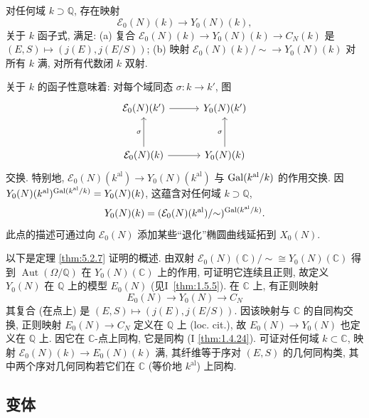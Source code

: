 \begin{theorem} \label{thm:5.2.7} 
对任何域 $k\supset\mathbb{Q}$, 存在映射
\[
\mathcal{E}_0(N)(k)\to Y_0(N)(k),
\]
关于 $k$ 函子式, 满足:
(a) 复合 $\mathcal{E}_0(N)(k)\to Y_0(N)(k)\to C_N(k)$ 是 $(E, S)\mapsto(j(E), j(E/S))$;
(b) 映射 $\mathcal{E}_0(N)(k)/{\sim}\to Y_0(N)(k)$ 对所有 $k$ 满, 对所有代数闭 $k$ 双射.
\end{theorem}

关于 $k$ 的函子性意味着: 对每个域同态 $\sigma\colon k\to k'$, 图
\[
\begin{tikzcd}[row sep=3em, column sep=3em]
    \mathcal{E}_0(N)(k') \arrow[r] & Y_0(N)(k') \\
    \mathcal{E}_0(N)(k) \arrow[u, "\sigma"] \arrow[r] & Y_0(N)(k) \arrow[u, "\sigma"]
\end{tikzcd}
\]
交换. 特别地, $\mathcal{E}_0(N)(k^{\mathrm{al}})\to Y_0(N)(k^{\mathrm{al}})$ 与 $\operatorname{Gal}(k^{\mathrm{al}}/k)$ 的作用交换. 因 $Y_0(N)(k^{\mathrm{al}})^{\operatorname{Gal}(k^{\mathrm{al}}/k)} = Y_0(N)(k)$, 这蕴含对任何域 $k\supset\mathbb{Q}$,
\[
Y_0(N)(k) = (\mathcal{E}_0(N)(k^{\mathrm{al}})/{\sim})^{\operatorname{Gal}(k^{\mathrm{al}}/k)}.
\]
此点的描述可通过向 $\mathcal{E}_0(N)$ 添加某些``退化''椭圆曲线延拓到 $X_0(N)$.

以下是定理 \ref{thm:5.2.7} 证明的概述. 由双射 $\mathcal{E}_0(N)(\mathbb{C})/{\sim}\cong Y_0(N)(\mathbb{C})$ 得到 $\operatorname{Aut}(\Omega/\mathbb{Q})$ 在 $Y_0(N)(\mathbb{C})$ 上的作用, 可证明它连续且正则, 故定义 $Y_0(N)$ 在 $\mathbb{Q}$ 上的模型 $E_0(N)$ (见I~\ref{thm:1.5.5}). 在 $\mathbb{C}$ 上, 有正则映射
\[
E_0(N)\to Y_0(N)\to C_N
\]
其复合 (在点上) 是 $(E, S)\mapsto(j(E), j(E/S))$. 因该映射与 $\mathbb{C}$ 的自同构交换, 正则映射 $E_0(N)\to C_N$ 定义在 $\mathbb{Q}$ 上 (loc. cit.), 故 $E_0(N)\to Y_0(N)$ 也定义在 $\mathbb{Q}$ 上. 因它在 $\mathbb{C}$-点上同构, 它是同构 (I \ref{thm:1.4.24}). 可证对任何域 $k\subset\mathbb{C}$, 映射 $\mathcal{E}_0(N)(k)\to E_0(N)(k)$ 满, 其纤维等于序对 $(E, S)$ 的几何同构类, 其中两个序对几何同构若它们在 $\mathbb{C}$ (等价地 $k^{\mathrm{al}}$) 上同构.

\subsection*{变体}

